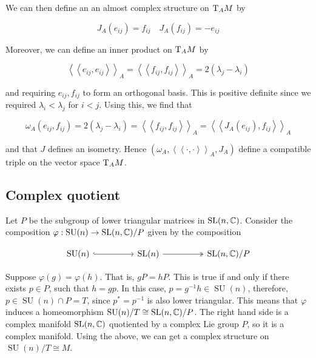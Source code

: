 \documentclass{article}
\DeclareMathOperator{\SU}{SU}
\newcommand{\iinner}[1]{\left\langle\!\left\langle #1 \right\rangle\!\right\rangle}
\begin{document}
We can then define an an almost complex structure on \(\mathrm{T}_AM\) by

\begin{equation}
    \label{eq:cx-str-vector}
    J_A(e_{ij}) = f_{ij} \quad J_A(f_{ij}) = -e_{ij}
\end{equation}

Moreover, we can define an inner product on \(\mathrm{T}_AM\) by

\[\iinner{e_{ij}, e_{ij}}_A = \iinner{f_{ij}, f_{ij}}_A = 2(\lambda_j - \lambda_i)\]

and requiring \(e_{ij}, f_{ij}\) to form an orthogonal basis. This is positive definite since we required \(\lambda_i < \lambda_j\) for \(i < j\). Using this, we find that

\[\omega_A(e_{ij}, f_{ij}) = 2(\lambda_j - \lambda_i) = \iinner{f_{ij}, f_{ij}}_A = \iinner{J_A(e_{ij}), f_{ij}}_A\]

and that \(J\) defines an isometry. Hence \((\omega_A, \iinner{\cdot, \cdot}_A, J_A)\) define a compatible triple on the vector space \(\mathrm{T}_AM\).

\subsection{Complex quotient}

\label{sec:cx-quot}

Let \(P\) be the subgroup of lower triangular matrices in \(\operatorname{SL}(n, \mathbb{C})\). Consider the composition \(\varphi : \SU(n) \to \SL(n, \C)/P\) given by the composition 

\[\begin{tikzcd}
	{\SU(n)} && {\SL(n)} && {\SL(n, \C)/P}
	\arrow[hook, from=1-1, to=1-3]
	\arrow[two heads, from=1-3, to=1-5]
\end{tikzcd}\]

Suppose \(\varphi(g) = \varphi(h)\). That is, \(gP = hP\). This is true if and only if there exists \(p \in P\), such that \(h = gp\). In this case, \(p = g^{-1}h \in \SU(n)\), therefore, \(p \in \SU(n) \cap P = T\), since \(p^* = p^{-1}\) is also lower triangular. This means that \(\varphi\) induces a homeomorphism \(\SU(n)/T \cong \SL(n, \C)/P\). The right hand side is a complex manifold \(\operatorname{SL}(n, \mathbb{C})\) quotiented by a complex Lie group \(P\), so it is a complex manifold. Using the above, we can get a complex structure on \(\SU(n)/T \cong M\).
\end{document}
